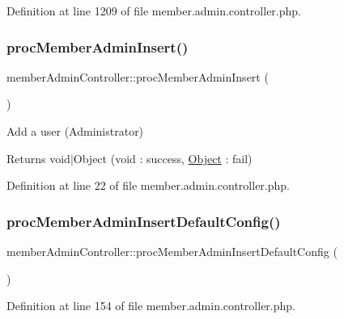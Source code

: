 Definition at line 1209 of file member.\+admin.\+controller.\+php.

\hypertarget{classmemberAdminController_a1e89340738ee22bd5af9de8521076aa0}{}\label{classmemberAdminController_a1e89340738ee22bd5af9de8521076aa0} 
\subsubsection{\texorpdfstring{proc\+Member\+Admin\+Insert()}{procMemberAdminInsert()}}
{\footnotesize\ttfamily member\+Admin\+Controller\+::proc\+Member\+Admin\+Insert (\begin{DoxyParamCaption}{ }\end{DoxyParamCaption})}

Add a user (Administrator) \begin{DoxyReturn}{Returns}
void$\vert$\+Object (void \+: success, \hyperlink{classObject}{Object} \+: fail) 
\end{DoxyReturn}


Definition at line 22 of file member.\+admin.\+controller.\+php.

\hypertarget{classmemberAdminController_aed6b9a31f228437805b53841455ebeed}{}\label{classmemberAdminController_aed6b9a31f228437805b53841455ebeed} 
\subsubsection{\texorpdfstring{proc\+Member\+Admin\+Insert\+Default\+Config()}{procMemberAdminInsertDefaultConfig()}}
{\footnotesize\ttfamily member\+Admin\+Controller\+::proc\+Member\+Admin\+Insert\+Default\+Config (\begin{DoxyParamCaption}{ }\end{DoxyParamCaption})}



Definition at line 154 of file member.\+admin.\+controller.\+php.

\hypertarget{classmemberAdminController_a58c482d52edd1fc9d61fd5111084586b}{}\label{classmemberAdminController_a58c482d52edd1fc9d61fd5111084586b} 
